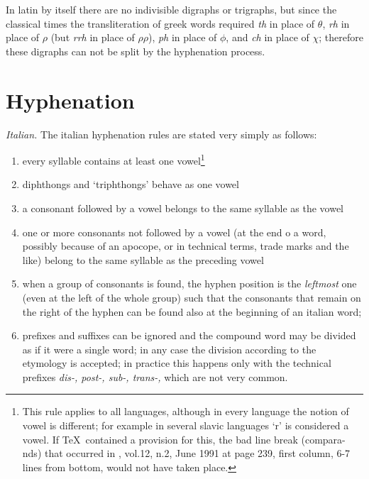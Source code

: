   In latin by itself there are no indivisible digraphs
or trigraphs, but since the classical times  the  transliteration  of  greek
words  required  {\it  th} in place of $\theta$, {\it rh} in place of $\rho$
(but {\it rrh} in place of $\rho\rho$), {\it ph} in  place  of  $\phi$,  and
{\it  ch}  in  place of $\chi$; therefore these digraphs can not be split by
the hyphenation process.

\section{Hyphenation}
{\it Italian.} The italian hyphenation rules are stated very simply as follows:
\begin{enumerate}

\item  every syllable contains at least one vowel\footnote{This rule applies
to all languages,  although  in  every  language  the  notion  of  vowel  is
different;  for  example  in  several  slavic  languages `r' is considered a
vowel. If  \TeX\  contained  a  provision  for  this,  the  bad  line  break
(compara-nds)  that  occurred  in  \TUB, vol.12, n.2, June 1991 at page 239,
first column, 6-7 lines from bottom, would not have taken place.}

\item diphthongs and `triphthongs' behave as one vowel

\item  a  consonant  followed by a vowel belongs to the same syllable as the
vowel

\item  one  or more consonants not followed by a vowel (at the end o a word,
possibly because of an apocope, or in technical terms, trade marks  and  the
like) belong to the same syllable as the preceding vowel

\item  when  a group of consonants is found, the hyphen position is the {\it
leftmost} one (even at the left of the whole group) such that the consonants
that remain on the right of the hyphen can be found also at the beginning of
an italian word;\label{cons}

\item  prefixes  and  suffixes  can  be ignored and the compound word may be
divided as if it were a single word; in any case the division  according  to
the  etymology is accepted; in practice this happens only with the technical
prefixes {\it dis-, post-, sub-, trans-,} which are not very common.

\end{enumerate}

